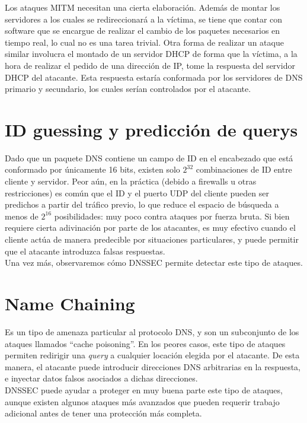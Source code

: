 Los ataques MITM necesitan una cierta elaboraci\'on. Adem\'as de montar los servidores a los cuales se redireccionar\'a a la v\'ictima, se tiene que contar con software que se encargue de realizar el cambio de los paquetes necesarios en tiempo real, lo cual no es una tarea trivial. Otra forma de realizar un ataque similar involucra el montado de un servidor DHCP de forma que la v\'ictima, a la hora de realizar el pedido de una direcci\'on de IP, tome la respuesta del servidor DHCP del atacante. Esta respuesta estar\'ia conformada por los servidores de DNS primario y secundario, los cuales ser\'ian controlados por el atacante.


\section{ID guessing y predicci\'on de querys}

Dado que un paquete DNS contiene un campo de ID en el encabezado que est\'a conformado por \'unicamente 16 bits, existen solo $2^{32}$ combinaciones de ID entre cliente y servidor. Peor a\'un, en la pr\'actica (debido a firewalls u otras restricciones) es com\'un que el ID y el puerto UDP del cliente pueden ser predichos a partir del tr\'afico previo, lo que reduce el espacio de b\'usqueda a menos de $2^{16}$ posibilidades: muy poco contra ataques por fuerza bruta. Si bien requiere cierta adivinaci\'on por parte de los atacantes, es muy efectivo cuando el cliente act\'ua de manera predecible por situaciones particulares, y puede permitir que el atacante introduzca falsas respuestas.\\
Una vez m\'as, observaremos c\'omo DNSSEC permite detectar este tipo de ataques.

\section{Name Chaining}

Es un tipo de amenaza particular al protocolo DNS, y son un subconjunto de los ataques llamados ``cache poisoning''. En los peores casos, este tipo de ataques permiten redirigir una \textit{query} a cualquier locaci\'on elegida por el atacante. De esta manera, el atacante puede introducir direcciones DNS arbitrarias en la respuesta, e inyectar datos falsos asociados a dichas direcciones.\\
DNSSEC puede ayudar a proteger en muy buena parte este tipo de ataques, aunque existen algunos ataques m\'as avanzados que pueden requerir trabajo adicional antes de tener una protecci\'on m\'as completa.


